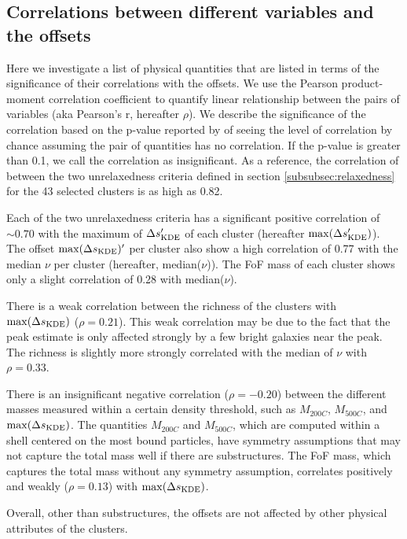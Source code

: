 \subsection{Correlations between different variables and the offsets}

Here we investigate a list of physical quantities that are listed in terms of
the significance of their correlations with the offsets. 
We use the Pearson product-moment correlation coefficient to quantify linear 
relationship between the pairs of variables
(aka Pearson's r,  hereafter $\rho$).
We describe the significance of the correlation 
based on the p-value reported by {} of seeing the level of 
correlation by chance assuming the pair of 
quantities has no correlation. If the p-value is greater than 0.1, we call the
correlation as insignificant.
As a reference, the correlation of between the 
two unrelaxedness criteria defined in section \ref{subsubsec:relaxedness}
for the 43 selected clusters is as high as 0.82. 

Each of the two unrelaxedness criteria has a significant positive correlation of $\sim 0.70$
with the maximum of $\Delta s_{\rm KDE}'$ of each cluster
(hereafter $\max(\Delta s_{\rm KDE}')$).
The offset $\max(\Delta s_{\rm KDE})'$ per cluster also show a high
correlation of 0.77 with the median $\nu$ per cluster (hereafter,
median($\nu$)). The FoF mass of each cluster shows only a slight correlation of 0.28 with 
 median($\nu$).

There is a weak correlation between the richness of the
clusters with $\max(\Delta s_{\rm KDE})$ ($\rho = 0.21$). This weak correlation 
may be due to 
the fact that the peak estimate is only affected strongly by a few bright galaxies near 
the peak. The richness is slightly more strongly correlated with the median of $\nu$ 
with $\rho = 0.33$. 

There is an insignificant negative correlation ($\rho = -0.20$) between the 
different masses 
measured within a certain density threshold, such as $M_{200C}$, $M_{500C}$, 
and $\max(\Delta s_{\rm KDE})$. The quantities $M_{200C}$ and $M_{500C}$, which
are computed within a shell centered on the most bound particles, have
symmetry assumptions that may not capture the total mass well if there are substructures. 
The FoF mass, which
captures the total mass without any symmetry assumption, correlates positively
and weakly 
($\rho = 0.13$) with $\max(\Delta s_{\rm KDE})$. 

Overall, other than substructures, the offsets are not affected by
other physical attributes of the clusters.

